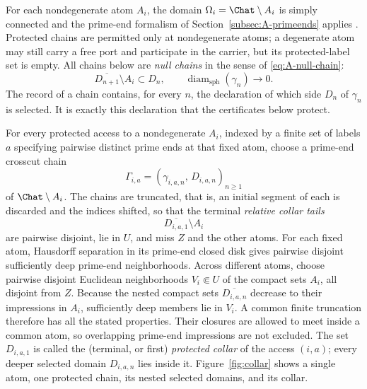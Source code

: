 For each nondegenerate atom $A_i$, the domain
$\Omega_i=\Chat\setminus A_i$ is simply connected and the prime-end
formalism of Section~\ref{subsec:A-primeends} applies \cite{Pom92}.
Protected chains are permitted only at nondegenerate atoms; a degenerate
atom may still carry a free port and participate in the carrier, but its
protected-label set is empty.  All chains below are \emph{null chains} in the
sense of
\eqref{eq:A-null-chain}:
\[
 \overline{D_{n+1}}\setminus A_i\subset D_n,
 \qquad
 \operatorname{diam}_{\mathrm{sph}}(\gamma_n)\longrightarrow0.
\]
The record of a chain contains, for every $n$, the declaration of which
side $D_n$ of $\gamma_n$ is selected.  It is exactly this declaration that
the certificates below protect.

For every protected access to a nondegenerate $A_i$, indexed by a finite
set of labels $a$ specifying pairwise distinct prime ends at that fixed
atom, choose a prime-end crosscut chain
\[
\Gamma_{i,a}=(\gamma_{i,a,n},\,D_{i,a,n})_{n\ge1}
\]
of $\Chat\setminus A_i$.  The chains are truncated, that is, an initial
segment of each is discarded and the indices shifted, so that the terminal
\emph{relative collar tails}
\[
\overline{D_{i,a,1}}\setminus A_i
\]
are pairwise disjoint, lie in $U$, and miss $Z$ and the other atoms.  For
each fixed atom, Hausdorff separation in its prime-end closed disk gives
pairwise disjoint sufficiently deep prime-end neighborhoods.  Across
different atoms, choose pairwise disjoint Euclidean neighborhoods
$V_i\Subset U$ of the compact sets $A_i$, all disjoint from $Z$.
Because the nested compact sets $\overline{D_{i,a,n}}$ decrease to their
impressions in $A_i$, sufficiently deep members lie in $V_i$.  A common
finite truncation therefore has all the stated properties.  Their closures are allowed
to meet inside a common atom, so overlapping prime-end impressions are not
excluded.  The set $D_{i,a,1}$ is called the (terminal, or first)
\emph{protected collar} of the access $(i,a)$; every deeper selected domain
$D_{i,a,n}$ lies inside it.  Figure~\ref{fig:collar} shows a single atom,
one protected chain, its nested selected domains, and its collar.


